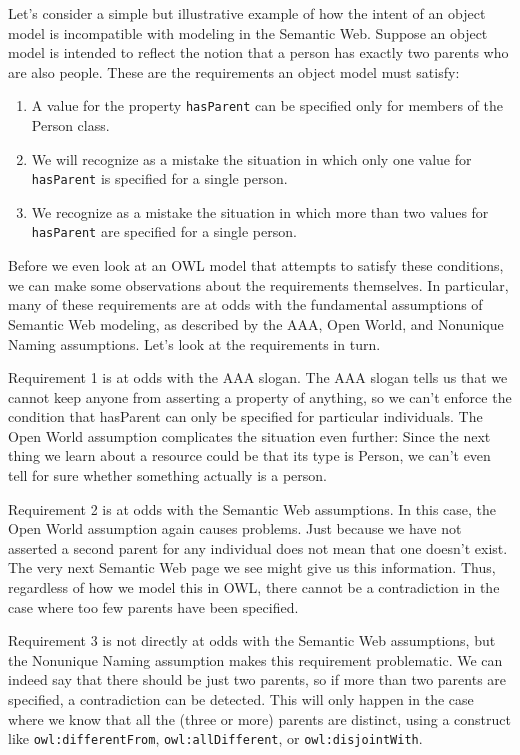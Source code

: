 Let's consider a simple but illustrative example of how the intent of an
object model is incompatible with modeling in the Semantic Web. Suppose
an object model is intended to reflect the notion that a person has
exactly two parents who are also people. These are the requirements an
object model must satisfy:

\begin{enumerate}
\item A value for the property \texttt{hasParent} can be specified only for members
of the Person class.

\item  We will recognize as a mistake the situation in which only one value
for \texttt{hasParent} is specified for a single person.

\item  We recognize as a mistake the situation in which more than two values
for \texttt{hasParent} are specified for a single person.
\end{enumerate}


Before we even look at an OWL model that attempts to satisfy these
conditions, we can make some observations about the requirements
themselves. In particular, many of these requirements are at odds with
the fundamental assumptions of Semantic Web modeling, as described by
the AAA, Open World, and Nonunique Naming assumptions. Let's look at the
requirements in turn.

Requirement 1 is at odds with the AAA slogan. The AAA slogan tells us
that we cannot keep anyone from asserting a property of anything, so we
can't enforce the condition that hasParent can only be specified for
particular individuals. The Open World assumption complicates the
situation even further: Since the next thing we learn about a resource
could be that its type is Person, we can't even tell for sure whether
something actually is a person.

Requirement 2 is at odds with the Semantic Web assumptions. In this
case, the Open World assumption again causes problems. Just because we
have not asserted a second parent for any individual does not mean that
one doesn't exist. The very next Semantic Web page we see might give us
this information. Thus, regardless of how we model this in OWL, there
cannot be a contradiction in the case where too few parents have been
specified.

Requirement 3 is not directly at odds with the Semantic Web assumptions,
but the Nonunique Naming assumption makes this requirement problematic.
We can indeed say that there should be just two parents, so if more than
two parents are specified, a contradiction can be detected. This will
only happen in the case where we know that all the (three or more)
parents are distinct, using a construct like \texttt{owl:differentFrom},
\texttt{owl:allDifferent}, or \texttt{owl:disjointWith}.

